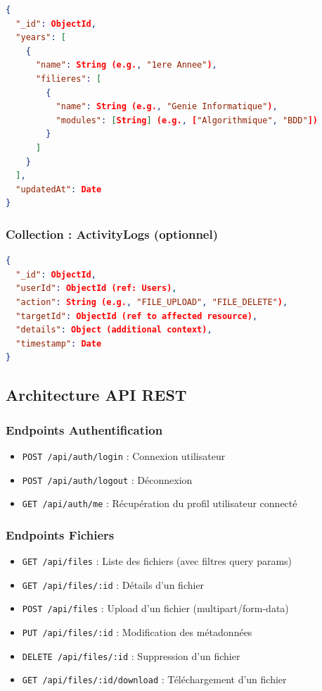 \documentclass[12pt,a4paper]{article}
\begin{document}
\begin{lstlisting}[language=json, basicstyle=\small\ttfamily]
{
  "_id": ObjectId,
  "years": [
    {
      "name": String (e.g., "1ere Annee"),
      "filieres": [
        {
          "name": String (e.g., "Genie Informatique"),
          "modules": [String] (e.g., ["Algorithmique", "BDD"])
        }
      ]
    }
  ],
  "updatedAt": Date
}
\end{lstlisting}

\subsubsection{Collection : ActivityLogs (optionnel)}

\begin{lstlisting}[language=json, basicstyle=\small\ttfamily]
{
  "_id": ObjectId,
  "userId": ObjectId (ref: Users),
  "action": String (e.g., "FILE_UPLOAD", "FILE_DELETE"),
  "targetId": ObjectId (ref to affected resource),
  "details": Object (additional context),
  "timestamp": Date
}
\end{lstlisting}

\subsection{Architecture API REST}

\subsubsection{Endpoints Authentification}

\begin{itemize}[leftmargin=*]
    \item \texttt{POST /api/auth/login} : Connexion utilisateur
    \item \texttt{POST /api/auth/logout} : Déconnexion
    \item \texttt{GET /api/auth/me} : Récupération du profil utilisateur connecté
\end{itemize}

\subsubsection{Endpoints Fichiers}

\begin{itemize}[leftmargin=*]
    \item \texttt{GET /api/files} : Liste des fichiers (avec filtres query params)
    \item \texttt{GET /api/files/:id} : Détails d'un fichier
    \item \texttt{POST /api/files} : Upload d'un fichier (multipart/form-data)
    \item \texttt{PUT /api/files/:id} : Modification des métadonnées
    \item \texttt{DELETE /api/files/:id} : Suppression d'un fichier
    \item \texttt{GET /api/files/:id/download} : Téléchargement d'un fichier
\end{itemize}
\end{document}
